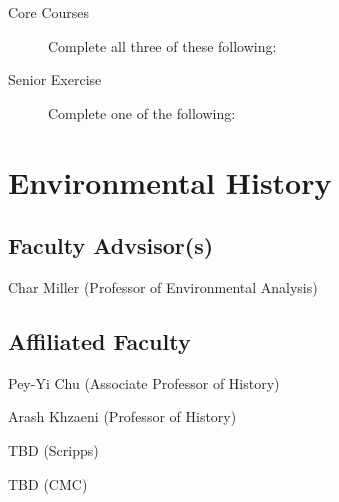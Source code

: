 \documentclass{article}\usepackage[]{graphicx}\usepackage[]{xcolor}
\newenvironment{itemize*}%
  {\begin{itemize}%
    \setlength{\itemsep}{0pt}%
    \setlength{\parskip}{0pt}}%
  {\end{itemize}}
\begin{document}
\begin{description}

 \item[Core Courses] Complete all three of these following:
  

  \item[Senior Exercise] Complete one of the following:
  




\end{description}

\newpage %
\section{Environmental History}



\subsection{Faculty Advsisor(s)}

\begin{itemize*}
  \item Char Miller (Professor of Environmental Analysis)
\end{itemize*}

\subsection{Affiliated Faculty}

\begin{itemize*}
  \item Pey-Yi Chu (Associate Professor of History)
  \item Arash Khzaeni (Professor of History)
  \item TBD (Scripps)
  \item TBD (CMC)
\end{itemize*}
\end{document}
